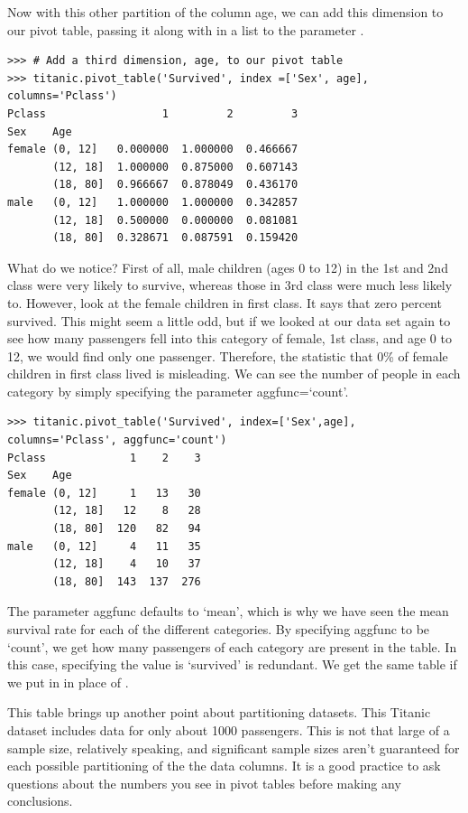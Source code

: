 Now with this other partition of the column age, we can add this dimension to our pivot table, passing it along with  in a list to the parameter .

\begin{lstlisting}
>>> # Add a third dimension, age, to our pivot table
>>> titanic.pivot_table('Survived', index =['Sex', age], columns='Pclass')
Pclass                  1         2         3
Sex    Age                                   
female (0, 12]   0.000000  1.000000  0.466667
       (12, 18]  1.000000  0.875000  0.607143
       (18, 80]  0.966667  0.878049  0.436170
male   (0, 12]   1.000000  1.000000  0.342857
       (12, 18]  0.500000  0.000000  0.081081
       (18, 80]  0.328671  0.087591  0.159420
\end{lstlisting}

What do we notice? First of all, male children (ages 0 to 12) in the 1st and 2nd class were very likely to survive, whereas those in 3rd class were much less likely to. However, look at the female children in first class. It says that zero percent survived. This might seem a little odd, but if we looked at our data set again to see how many passengers fell into this category of female, 1st class, and age 0 to 12, we would find only one passenger. Therefore, the statistic that 0\% of female children in first class lived is misleading. We can see the number of people in each category by simply specifying the parameter aggfunc=`count'.

\begin{lstlisting}
>>> titanic.pivot_table('Survived', index=['Sex',age], columns='Pclass', aggfunc='count')
Pclass             1    2    3
Sex    Age                    
female (0, 12]     1   13   30
       (12, 18]   12    8   28
       (18, 80]  120   82   94
male   (0, 12]     4   11   35
       (12, 18]    4   10   37
       (18, 80]  143  137  276
\end{lstlisting}

The parameter aggfunc defaults to `mean', which is why we have seen the mean survival rate for each of the different categories. By specifying aggfunc to be `count', we get how many passengers of each category are present in the table. In this case, specifying the value is `survived' is redundant. We get the same table if we put in  in place of .

This table brings up another point about partitioning datasets. This Titanic dataset includes data for only about 1000 passengers. This is not that large of a sample size, relatively speaking, and significant sample sizes aren't guaranteed for each possible partitioning of the the data columns. It is a good practice to ask questions about the numbers you see in pivot tables before making any conclusions.

